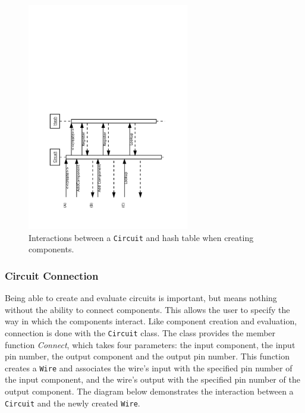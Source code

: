 \documentclass{article}
\newcommand{\ClassName}[1]{\texttt{#1}}
\newcommand{\FunctionName}[1]{\textit{#1}}
\begin{document}
\begin{figure}[H]
    \begin{center}
        \includegraphics[angle=270,width=200pt]{imgs/ComponentCreationInteraction.pdf}
    \end{center}
    \caption{Interactions between a \ClassName{Circuit} and hash table when creating components.}
\end{figure}

\subsubsection{Circuit Connection}

Being able to create and evaluate circuits is important, but means nothing without the ability to connect components. This allows the user to specify the way in which the components interact. Like component creation and evaluation, connection is done with the \ClassName{Circuit} class. The class provides the member function \FunctionName{Connect}, which takes four parameters: the input component, the input pin number, the output component and the output pin number. This function creates a \ClassName{Wire} and associates the wire's input with the specified pin number of the input component, and the wire's output with the specified pin number of the output component. The diagram below demonstrates the interaction between a \ClassName{Circuit} and the newly created \ClassName{Wire}.
\end{document}
